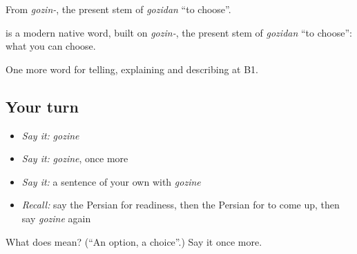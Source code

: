 From \emph{gozin-}, the present stem of \emph{gozidan} \textquotedblleft{}to choose\textquotedblright{}.

\begin{cousinweb}
\textbf{} is a modern native word, built on \emph{gozin-}, the present stem of \emph{gozidan} \textquotedblleft{}to choose\textquotedblright{}: what you can choose.
\end{cousinweb}

\begin{grammarlens}[title={What you've built}]
One more word for telling, explaining and describing at B1.
\end{grammarlens}

\subsection*{Your turn}
\begin{itemize}
\raggedright
  \item \emph{Say it:} \emph{gozine}
  \item \emph{Say it:} \emph{gozine}, once more
  \item \emph{Say it:} a sentence of your own with \emph{gozine}
  \item \emph{Recall:} say the Persian for readiness, then the Persian for to come up, then say \emph{gozine} again
\end{itemize}

\begin{tcolorbox}[breakable,colback=teal!4,colframe=teal!35!black,title={Before you move on}]
What does  mean? (\textquotedblleft{}An option, a choice\textquotedblright{}.) Say it once more.
\end{tcolorbox}
